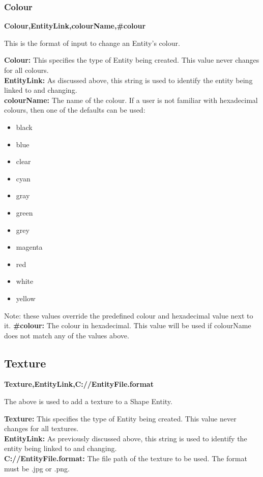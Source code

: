 \documentclass[a4paper,12pt]{article}
\begin{document}
\subsubsection{Colour}

\textbf{Colour,EntityLink,colourName,\#colour}

This is the format of input to change an Entity's colour.

\textbf{Colour:} This specifies the type of Entity being created. This value never changes for all colours.\\
\textbf{EntityLink:} As discussed above, this string is used to identify the entity being linked to and changing.\\
\textbf{colourName:} The name of the colour. If a user is not familiar with hexadecimal colours, then one of the defaults can be used:
\begin{itemize}
\item black
\item blue
\item clear
\item cyan
\item gray
\item green
\item grey
\item magenta
\item red
\item white
\item yellow
\end{itemize}
Note: these values override the predefined colour and hexadecimal value next to it.
\textbf{\#colour:} The colour in hexadecimal. This value will be used if colourName does not match any of the values above.

\subsection{Texture}

\textbf{Texture,EntityLink,C://EntityFile.format}

The above is used to add a texture to a Shape Entity.

\textbf{Texture:} This specifies the type of Entity being created. This value never changes for all textures.\\
\textbf{EntityLink:} As previously discussed above, this string is used to identify the entity being linked to and changing.\\
\textbf{C://EntityFile.format:} The file path of the texture to be used. The format must be .jpg or .png.
\end{document}
